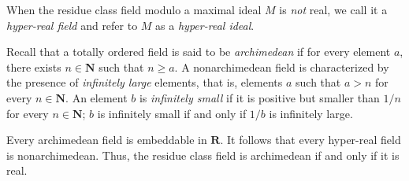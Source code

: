 When the residue class field modulo a maximal ideal $M$ is \emph{not} real, we call it a \emph{hyper-real field} and refer to $M$ as a \emph{hyper-real ideal}.

Recall that a totally ordered field is said to be \emph{archimedean} if for every element $a$, there exists $n \in \mathbf{N}$ such that $n \geq a$. A nonarchimedean field is characterized by the presence of \emph{infinitely large} elements, that is, elements $a$ such that $a > n$ for every $n \in \mathbf{N}$. An element $b$ is \emph{infinitely small} if it is positive but smaller than $1/n$ for every $n \in \mathbf{N}$; $b$ is infinitely small if and only if $1/b$ is infinitely large.

Every archimedean field is embeddable in $\mathbf{R}$. It follows that every hyper-real field is nonarchimedean. Thus, the residue class field is archimedean if and only if it is real.
